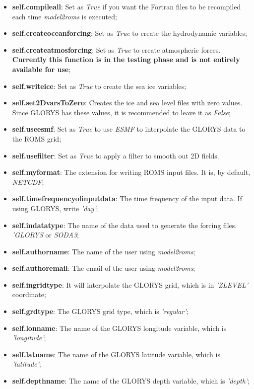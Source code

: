\begin{itemize}
    \item \textbf{self.compileall}: Set as \textit{True} if you want the Fortran files to be recompiled each time \textit{model2roms} is executed;
    \item \textbf{self.createoceanforcing}: Set as \textit{True} to create the hydrodynamic variables;
    \item \textbf{self.createatmosforcing}: Set as \textit{True} to create atmospheric forces. \textbf{Currently this function is in the testing phase and is not entirely available for use};
    \item \textbf{self.writeice}: Set as \textit{True} to create the sea ice variables;
    \item \textbf{self.set2DvarsToZero}: Creates the ice and sea level files with zero values. Since GLORYS has these values, it is recommended to leave it as \textit{False};
    \item \textbf{self.useesmf}: Set as \textit{True} to use \textit{ESMF} to interpolate the GLORYS data to the ROMS grid;
    \item \textbf{self.usefilter}: Set as \textit{True} to apply a filter to smooth out 2D fields.
    \item \textbf{self.myformat}: The extension for writing ROMS input files. It is, by default, \textit{NETCDF};
    \item \textbf{self.timefrequencyofinputdata}: The time frequency of the input data. If using GLORYS, write \textit{'day'};
    \item \textbf{self.indatatype}: The name of the data used to generate the forcing files. \textit{'GLORYS} or \textit{SODA3};
    \item \textbf{self.authorname}: The name of the user using \textit{model2roms};
    \item \textbf{self.authoremail}: The email of the user using \textit{model2roms};
    \item \textbf{self.ingridtype}: It will interpolate the GLORYS grid, which is in \textit{'ZLEVEL'} coordinate;
    \item \textbf{self.grdtype}: The GLORYS grid type, which is \textit{'regular'};
    \item \textbf{self.lonname}: The name of the GLORYS longitude variable, which is \textit{'longitude'};
    \item \textbf{self.latname}: The name of the GLORYS latitude variable, which is \textit{'latitude'};
    \item \textbf{self.depthname}: The name of the GLORYS depth variable, which is \textit{'depth'};

\end{itemize}

